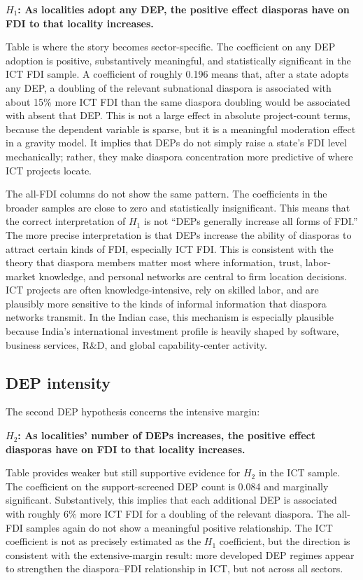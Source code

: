 \documentclass[12pt]{article}
\let\oldsubsection\subsection
\renewcommand{\subsection}{\FloatBarrier\oldsubsection}
\begin{document}
\textbf{$H_1$: As localities adopt any DEP, the positive effect diasporas have on FDI to that locality increases.}

Table  is where the story becomes sector-specific. The coefficient on any DEP adoption is positive, substantively meaningful, and statistically significant in the ICT FDI sample. A coefficient of roughly 0.196 means that, after a state adopts any DEP, a doubling of the relevant subnational diaspora is associated with about 15\% more ICT FDI than the same diaspora doubling would be associated with absent that DEP. This is not a large effect in absolute project-count terms, because the dependent variable is sparse, but it is a meaningful moderation effect in a gravity model. It implies that DEPs do not simply raise a state's FDI level mechanically; rather, they make diaspora concentration more predictive of where ICT projects locate.

The all-FDI columns do not show the same pattern. The coefficients in the broader samples are close to zero and statistically insignificant. This means that the correct interpretation of $H_1$ is not ``DEPs generally increase all forms of FDI.'' The more precise interpretation is that DEPs increase the ability of diasporas to attract certain kinds of FDI, especially ICT FDI. This is consistent with the theory that diaspora members matter most where information, trust, labor-market knowledge, and personal networks are central to firm location decisions. ICT projects are often knowledge-intensive, rely on skilled labor, and are plausibly more sensitive to the kinds of informal information that diaspora networks transmit. In the Indian case, this mechanism is especially plausible because India's international investment profile is heavily shaped by software, business services, R\&D, and global capability-center activity.

\subsection{DEP intensity}

The second DEP hypothesis concerns the intensive margin:

\textbf{$H_2$: As localities' number of DEPs increases, the positive effect diasporas have on FDI to that locality increases.}

Table  provides weaker but still supportive evidence for $H_2$ in the ICT sample. The coefficient on the support-screened DEP count is 0.084 and marginally significant. Substantively, this implies that each additional DEP is associated with roughly 6\% more ICT FDI for a doubling of the relevant diaspora. The all-FDI samples again do not show a meaningful positive relationship. The ICT coefficient is not as precisely estimated as the $H_1$ coefficient, but the direction is consistent with the extensive-margin result: more developed DEP regimes appear to strengthen the diaspora--FDI relationship in ICT, but not across all sectors.
\end{document}
